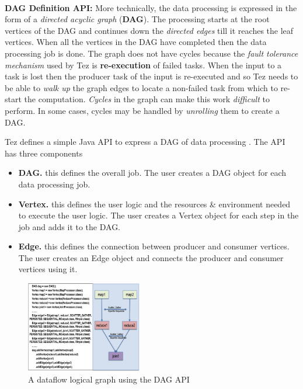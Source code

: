 \documentclass[twocolumn]{article}
\begin{document}
\noindent
\\
\textbf{DAG Definition API:} More technically, the data processing is expressed in the form of a
\emph{directed acyclic graph} (\textbf{DAG}). The processing starts at
the root vertices of the DAG and continues down the \emph{directed
edges} till it reaches the leaf vertices. When all the vertices in the
DAG have completed then the data processing job is done. The graph does
not have cycles because the \emph{fault tolerance mechanism} used by Tez
is \textbf{re-execution} of failed tasks. When the input to a task is
lost then the producer task of the input is re-executed and so Tez needs
to be able to \emph{walk up} the graph edges to locate a non-failed task
from which to re-start the computation. \emph{Cycles} in the graph can
make this work \emph{difficult} to perform. In some cases, cycles may be
handled by \emph{unrolling} them to create a DAG.

Tez defines a simple Java API to express a DAG of data processing \cite{Saha:2013-02}. 
The API has three components

\begin{itemize}
\item
  \textbf{DAG.} this defines the overall job. The user creates a DAG
  object for each data processing job.
\item
  \textbf{Vertex.} this defines the user logic and the resources \&
  environment needed to execute the user logic. The user creates a
  Vertex object for each step in the job and adds it to the DAG.
\item
  \textbf{Edge.} this defines the connection between producer and
  consumer vertices. The user creates an Edge object and connects the
  producer and consumer vertices using it.
\end{itemize}

\begin{figure}[htb]
        \centering
        \includegraphics[width=0.45\textwidth]{tez11}
        \caption{A dataflow logical graph using the DAG API}
        \label{fig07}
\end{figure}
\end{document}
